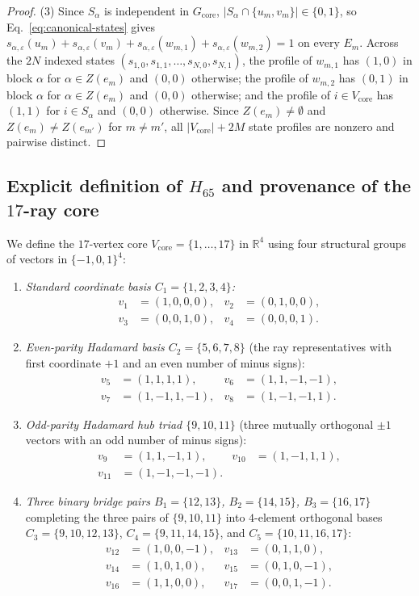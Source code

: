 \documentclass[
  aps,
  pra,
  reprint,
  superscriptaddress,
  amsmath,
  amssymb,
  nofootinbib,
  floatfix
]{revtex4-2}
\theoremstyle{definition}
\theoremstyle{remark}
\newcommand{\R}{\mathbb{R}}
\begin{document}
\begin{proof}
(3) Since $S_\alpha$ is independent in $G_{\mathrm{core}}$, $|S_\alpha\cap\{u_m,v_m\}|\in\{0,1\}$, so Eq.~\eqref{eq:canonical-states} gives $s_{\alpha,\varepsilon}(u_m)+s_{\alpha,\varepsilon}(v_m)+s_{\alpha,\varepsilon}(w_{m,1})+s_{\alpha,\varepsilon}(w_{m,2})=1$ on every $E_m$. Across the $2N$ indexed states $(s_{1,0},s_{1,1},\ldots,s_{N,0},s_{N,1})$, the profile of $w_{m,1}$ has $(1,0)$ in block $\alpha$ for $\alpha\in Z(e_m)$ and $(0,0)$ otherwise; the profile of $w_{m,2}$ has $(0,1)$ in block $\alpha$ for $\alpha\in Z(e_m)$ and $(0,0)$ otherwise; and the profile of $i\in V_{\mathrm{core}}$ has $(1,1)$ for $i\in S_\alpha$ and $(0,0)$ otherwise. Since $Z(e_m)\ne\emptyset$ and $Z(e_m)\ne Z(e_{m'})$ for $m\ne m'$, all $|V_{\mathrm{core}}|+2M$ state profiles are nonzero and pairwise distinct.
\end{proof}

\subsection{Explicit definition of \texorpdfstring{$H_{65}$}{H\_65} and provenance of the \texorpdfstring{$17$}{17}-ray core}

We define the $17$-vertex core $V_{\mathrm{core}}=\{1,\ldots,17\}$ in $\R^4$ using four structural groups of vectors in $\{-1,0,1\}^4$:
\begin{enumerate}
\item \emph{Standard coordinate basis $C_1=\{1,2,3,4\}$:}
\begin{align*}
v_1&=(1,0,0,0),& v_2&=(0,1,0,0),\\
v_3&=(0,0,1,0),& v_4&=(0,0,0,1).
\end{align*}
\item \emph{Even-parity Hadamard basis $C_2=\{5,6,7,8\}$} (the ray representatives with first coordinate $+1$ and an even number of minus signs):
\begin{align*}
v_5&=(1,1,1,1),& v_6&=(1,1,-1,-1),\\
v_7&=(1,-1,1,-1),& v_8&=(1,-1,-1,1).
\end{align*}
\item \emph{Odd-parity Hadamard hub triad $\{9,10,11\}$} (three mutually orthogonal $\pm1$ vectors with an odd number of minus signs):
\begin{align*}
v_9&=(1,1,-1,1),& v_{10}&=(1,-1,1,1),\\
v_{11}&=(1,-1,-1,-1).
\end{align*}
\item \emph{Three binary bridge pairs $B_1=\{12,13\}$, $B_2=\{14,15\}$, $B_3=\{16,17\}$} completing the three pairs of $\{9,10,11\}$ into $4$-element orthogonal bases $C_3=\{9,10,12,13\}$, $C_4=\{9,11,14,15\}$, and $C_5=\{10,11,16,17\}$:
\begin{align*}
v_{12}&=(1,0,0,-1),& v_{13}&=(0,1,1,0),\\
v_{14}&=(1,0,1,0),& v_{15}&=(0,1,0,-1),\\
v_{16}&=(1,1,0,0),& v_{17}&=(0,0,1,-1).
\end{align*}
\end{enumerate}
\end{document}

